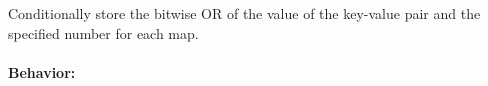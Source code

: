 Conditionally store the bitwise OR of the value of the key-value pair and the
specified number for each map.

\paragraph{Behavior:}
\begin{itemize}[noitemsep]



\end{itemize}
